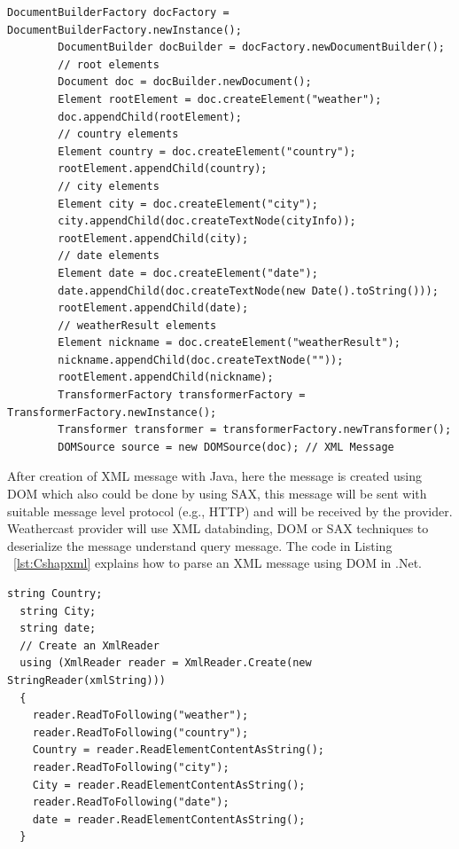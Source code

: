 \begin{lstlisting}[caption=XML message creation with Java Code, label=lst:javaxml]
  		DocumentBuilderFactory docFactory = DocumentBuilderFactory.newInstance();
  		DocumentBuilder docBuilder = docFactory.newDocumentBuilder();
  		// root elements
  		Document doc = docBuilder.newDocument();
  		Element rootElement = doc.createElement("weather");
  		doc.appendChild(rootElement);
  		// country elements
  		Element country = doc.createElement("country");
  		rootElement.appendChild(country);
  		// city elements
  		Element city = doc.createElement("city");
  		city.appendChild(doc.createTextNode(cityInfo));
  		rootElement.appendChild(city);
  		// date elements
  		Element date = doc.createElement("date");
  		date.appendChild(doc.createTextNode(new Date().toString()));
  		rootElement.appendChild(date);
  		// weatherResult elements
  		Element nickname = doc.createElement("weatherResult");
  		nickname.appendChild(doc.createTextNode(""));
  		rootElement.appendChild(nickname);
  		TransformerFactory transformerFactory = TransformerFactory.newInstance();
  		Transformer transformer = transformerFactory.newTransformer();
  		DOMSource source = new DOMSource(doc); // XML Message
\end{lstlisting}

After creation of XML message with Java, here the message is created using DOM which also could be done by using SAX, this message will be sent with suitable message level protocol (e.g., HTTP) and will be received by the provider. Weathercast provider will use XML databinding, DOM or SAX techniques to deserialize the message understand query message. The code in Listing ~\ref{lst:Cshapxml} explains how to parse an XML message using DOM in .Net.

\begin{lstlisting}[caption=XML message parsing with .Net Code, label=lst:Cshapxml]
  string Country;
  string City;
  string date;
  // Create an XmlReader
  using (XmlReader reader = XmlReader.Create(new StringReader(xmlString)))
  {
    reader.ReadToFollowing("weather");
    reader.ReadToFollowing("country");
    Country = reader.ReadElementContentAsString();
    reader.ReadToFollowing("city");
    City = reader.ReadElementContentAsString();
    reader.ReadToFollowing("date");
    date = reader.ReadElementContentAsString();
  }

\end{lstlisting}


